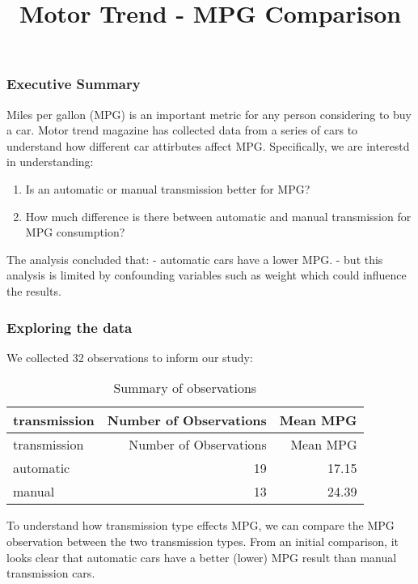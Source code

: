 \documentclass[]{article}
\title{Motor Trend - MPG Comparison}
\author{}
\date{}
\providecommand{\tightlist}{%
  \setlength{\itemsep}{0pt}\setlength{\parskip}{0pt}}
\begin{document}
\maketitle

\hypertarget{executive-summary}{%
\subsubsection{Executive Summary}\label{executive-summary}}

Miles per gallon (MPG) is an important metric for any person considering
to buy a car. Motor trend magazine has collected data from a series of
cars to understand how different car attirbutes affect MPG.
Specifically, we are interestd in understanding:

\begin{enumerate}
\def\labelenumi{\arabic{enumi}.}
\tightlist
\item
  Is an automatic or manual transmission better for MPG?
\item
  How much difference is there between automatic and manual transmission
  for MPG consumption?
\end{enumerate}

The analysis concluded that: - automatic cars have a lower MPG. - but
this analysis is limited by confounding variables such as weight which
could influence the results.

\hypertarget{exploring-the-data}{%
\subsubsection{Exploring the data}\label{exploring-the-data}}

We collected 32 observations to inform our study:

\begin{longtable}[]{@{}lrr@{}}
\caption{Summary of observations}\tabularnewline
\toprule
transmission & Number of Observations & Mean MPG\tabularnewline
\midrule
\endfirsthead
\toprule
transmission & Number of Observations & Mean MPG\tabularnewline
\midrule
\endhead
automatic & 19 & 17.15\tabularnewline
manual & 13 & 24.39\tabularnewline
\bottomrule
\end{longtable}

To understand how transmission type effects MPG, we can compare the MPG
observation between the two transmission types. From an initial
comparison, it looks clear that automatic cars have a better (lower) MPG
result than manual transmission cars.
\end{document}
